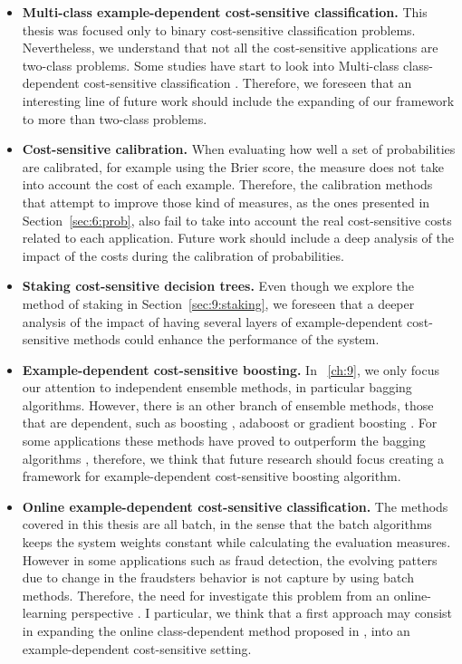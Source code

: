 \begin{itemize}
 \item \textbf{Multi-class example-dependent cost-sensitive classification.} This thesis was 
focused only to binary cost-sensitive classification problems. Nevertheless, we understand 
that not all the cost-sensitive applications are two-class problems. Some studies have start to 
look into Multi-class class-dependent cost-sensitive classification \citep{Zhou2010}. Therefore, we 
foreseen that an interesting line of future work should include the expanding of our framework to 
more than two-class problems.

 \item \textbf{Cost-sensitive calibration.} When evaluating how well a set of probabilities are 
calibrated, for example using the Brier score, the measure does not take into account the cost of 
each example. Therefore, the calibration methods that attempt to improve those kind of measures, as 
the ones presented in Section~\ref{sec:6:prob}, also fail to take into account the real 
cost-sensitive costs related to each application. Future work should include a deep analysis of the 
impact of the costs during the calibration of probabilities.

  \item \textbf{Staking cost-sensitive decision trees.} Even though we explore the method of 
staking in Section~\ref{sec:9:staking}, we foreseen that a deeper analysis of the impact of having 
several layers of example-dependent cost-sensitive methods could enhance the performance of the 
system.

  \item \textbf{Example-dependent cost-sensitive boosting.} In \chaptername{~\ref{ch:9}}, we 
only focus our attention to independent ensemble methods, in particular bagging algorithms. 
However, there is an other branch of ensemble methods, those that are dependent, such as 
boosting \citep{Schapire1990}, adaboost \citep{Freund1996} or gradient boosting 
\citep{Friedman2001,Friedman2002}. For some applications these methods have proved to outperform 
the bagging algorithms \citep{Zhou2012}, therefore, we think that future research should focus 
creating a framework for example-dependent cost-sensitive boosting algorithm.

  \item \textbf{Online example-dependent cost-sensitive classification.} The methods covered in 
this thesis are all batch, in the sense that the batch algorithms keeps the system weights constant 
while calculating the evaluation measures. However in some applications such as fraud detection, the 
evolving patters due to change in the fraudsters behavior is not capture by using batch methods. 
Therefore, the need for investigate this problem from an online-learning perspective 
\citep{Pozzolo2014}. I particular, we think that a first approach may consist in expanding the 
online class-dependent method proposed in \citep{Wang2014}, into an example-dependent cost-sensitive 
setting.
\end{itemize}
